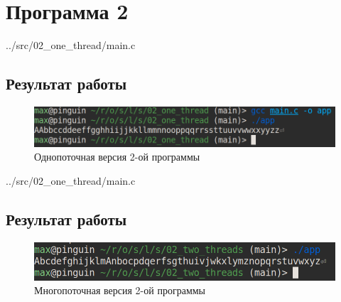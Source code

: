 \section*{Программа 2}
\begin{lstinputlisting}[label=third,caption=Однопоточная версия, language=c, firstline=1, lastline=24]{../src/02_one_thread/main.c}
\end{lstinputlisting}

\subsection*{Результат работы}
\begin{figure}[H]
	\centering
	\includegraphics[scale=0.5]{img/res_02_one.png}
	\caption{Однопоточная версия 2-ой программы}
	\label{fig:4}
\end{figure}

\begin{lstinputlisting}[label=third,caption=Многопоточная версия, language=c, firstline=1, lastline=26]{../src/02_one_thread/main.c}
\end{lstinputlisting}

\subsection*{Результат работы}
\begin{figure}[H]
	\centering
	\includegraphics[scale=0.5]{img/res_02_two.png}
	\caption{Многопоточная версия 2-ой программы}
	\label{fig:5}
\end{figure}

